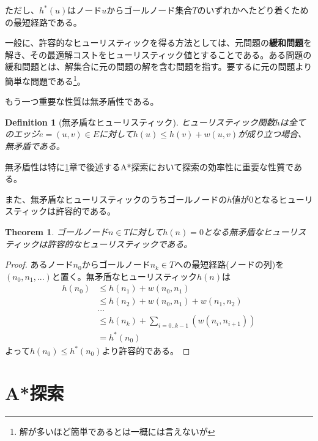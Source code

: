 \documentclass[b5paper]{report}
\newtheorem{definition}{Definition}
\newtheorem{theorem}{Theorem}
\begin{document}
ただし、$h^*(u)$はノード$u$からゴールノード集合$T$のいずれかへたどり着くための最短経路である。%

一般に、許容的なヒューリスティックを得る方法としては、元問題の{\bf 緩和問題}を解き、その最適解コストをヒューリスティック値とすることである。ある問題の緩和問題とは、解集合に元の問題の解を含む問題を指す。要するに元の問題より簡単な問題である\footnote{解が多いほど簡単であるとは一概には言えないが}。

もう一つ重要な性質は無矛盾性である。

\begin{definition}[無矛盾なヒューリスティック]
ヒューリスティック関数$h$は全てのエッジ$e = (u, v) \in E$に対して$h(u) \leq h(v) + w(u,v)$が成り立つ場合、無矛盾である。
\end{definition}

無矛盾性は特に\ref{sec:astar-search}章で後述するA*探索において探索の効率性に重要な性質である。

また、無矛盾なヒューリスティックのうちゴールノードの$h$値が0となるヒューリスティックは許容的である。

\begin{theorem}
ゴールノード$n \in T$に対して$h(n) = 0$となる無矛盾なヒューリスティックは許容的なヒューリスティックである。
\end{theorem}

\begin{proof}

あるノード$n_0$からゴールノード$n_k \in T$への最短経路(ノードの列)を$(n_0, n_1,...)$と置く。無矛盾なヒューリスティック$h(n)$は
\begin{align}
	h(n_0) &\leq h(n_1) + w(n_0, n_1) \\
			&\leq h(n_2) + w(n_0, n_1) + w(n_1, n_2) \\
			&... \\
			&\leq h(n_k) + \sum_{i=0..k-1}(w(n_i,n_{i+1})) \\
			&= h^*(n_0)
\end{align}
よって$h(n_0) \leq h^*(n_0)$より許容的である。

\end{proof}



\section{A*探索}
\label{sec:astar-search}
\end{document}
